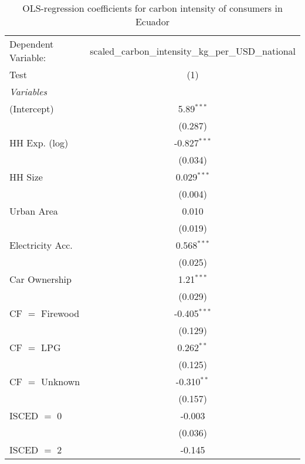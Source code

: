 
\begin{table}[htbp!]
   \centering
   \small
   \begin{adjustbox}{width = 1\textwidth, max height = 0.95\textheight, center}
      \begin{threeparttable}[b]
         \caption{\label{tab:OLS_1_ECU} OLS-regression coefficients for carbon intensity of consumers in Ecuador}
         \begin{tabular}{lc}
            \tabularnewline \midrule \midrule
            Dependent Variable: & scaled\_carbon\_intensity\_kg\_per\_USD\_national\\        
            Test                & (1)\\  
            \midrule
            \emph{Variables}\\
            (Intercept)         & 5.89$^{***}$\\   
                                & (0.287)\\   
            HH Exp. (log)       & -0.827$^{***}$\\   
                                & (0.034)\\   
            HH Size             & 0.029$^{***}$\\   
                                & (0.004)\\   
            Urban Area          & 0.010\\   
                                & (0.019)\\   
            Electricity Acc.    & 0.568$^{***}$\\   
                                & (0.025)\\   
            Car Ownership       & 1.21$^{***}$\\   
                                & (0.029)\\   
            CF $=$ Firewood     & -0.405$^{***}$\\   
                                & (0.129)\\   
            CF $=$ LPG          & 0.262$^{**}$\\   
                                & (0.125)\\   
            CF $=$ Unknown      & -0.310$^{**}$\\   
                                & (0.157)\\   
            ISCED $=$ 0         & -0.003\\   
                                & (0.036)\\   
            ISCED $=$ 2         & -0.145\\   

\end{tabular}
\end{threeparttable}
\end{adjustbox}
\end{table}
